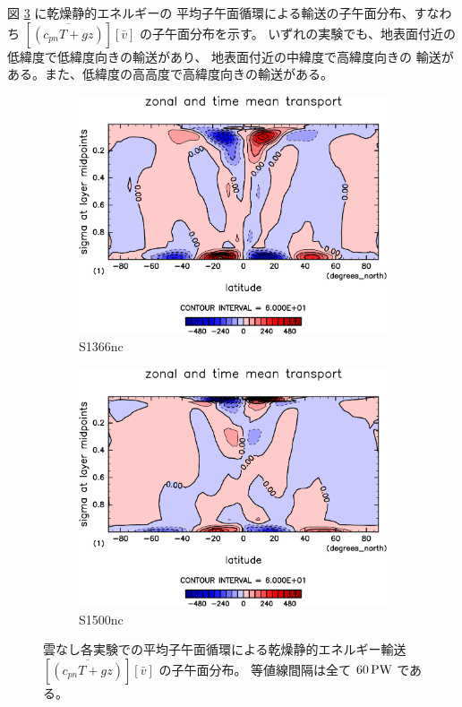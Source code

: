 \documentclass[body]{subfiles}
\begin{document}
図 \ref{乾燥静的エネルギー平均子午面循環nc} に乾燥静的エネルギーの
平均子午面循環による輸送の子午面分布、すなわち 
\([\overline{(c_{pn}T+gz)}][\bar v]\) の子午面分布を示す。
いずれの実験でも、地表面付近の低緯度で低緯度向きの輸送があり、
地表面付近の中緯度で高緯度向きの
輸送がある。また、低緯度の高高度で高緯度向きの輸送がある。

\begin{figure}[t]
	\centering
	\begin{subfigure}{.4\textwidth}
		\centering
		\includegraphics[width=\columnwidth]{S1366-nc/MeriHeatTransTest@dryStatEn_M,time=3650:4015-crop-rotate.pdf}
		\caption{S1366nc}\label{乾燥静的エネルギー平均子午面循環S1366nc}
	\end{subfigure}
	\begin{subfigure}{.4\textwidth}
		\centering
		\includegraphics[width=\columnwidth]{S1500-nc/MeriHeatTransTest@dryStatEn_M,time=3650:4015-crop-rotate.pdf}
		\caption{S1500nc}\label{乾燥静的エネルギー平均子午面循環S1500nc}
	\end{subfigure}
	\caption[雲なし各実験での平均子午面循環による乾燥静的エネルギー輸送の子午面分布]{
		雲なし各実験での平均子午面循環による乾燥静的エネルギー輸送 \([\overline{(c_{pn}T+gz)}][\bar v]\) の子午面分布。
		等値線間隔は全て \(60\hmu{PW}\) である。
	}\label{乾燥静的エネルギー平均子午面循環nc}
\end{figure}
\end{document}
